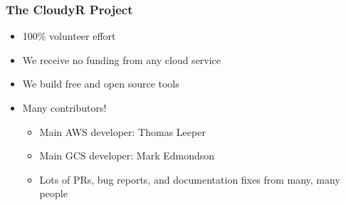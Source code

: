 \documentclass[14pt]{beamer}
\begin{document}
\begin{frame}
\frametitle{The CloudyR Project}
\begin{itemize}\itemsep1em
\item 100\% volunteer effort
\item We receive no funding from any cloud service
\item We build free and open source tools
\item Many contributors!
	\begin{itemize}
	\item Main AWS developer: Thomas Leeper
	\item Main GCS developer: Mark Edmondson
	\item Lots of PRs, bug reports, and documentation fixes from many, many people
	\end{itemize}
\end{itemize}
\end{frame}


\end{document}
